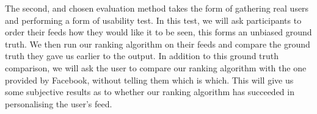 The second, and chosen evaluation method takes the form of gathering real users and performing a form of usability test. In this test, we will ask participants to order their feeds how they would like it to be seen, this forms an unbiased ground truth. We then run our ranking algorithm on their feeds and compare the ground truth they gave us earlier to the output. In addition to this ground truth comparison, we will ask the user to compare our ranking algorithm with the one provided by Facebook, without telling them which is which. This will give us some subjective results as to whether our ranking algorithm has succeeded in personalising the user's feed.